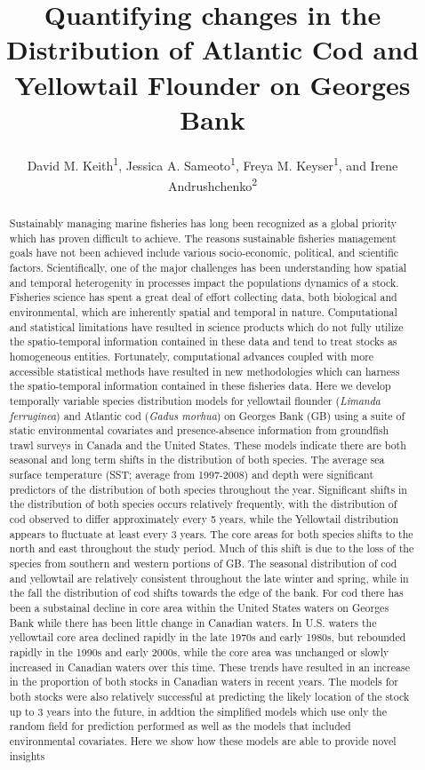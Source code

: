 \documentclass[
]{article}
\title{Quantifying changes in the Distribution of Atlantic Cod and Yellowtail Flounder on Georges Bank}
\author{David M. Keith\textsuperscript{1},
Jessica A. Sameoto\textsuperscript{1},
Freya M. Keyser\textsuperscript{1}, and
Irene Andrushchenko\textsuperscript{2}}
\date{}
\begin{document}
\maketitle
\begin{abstract}
Sustainably managing marine fisheries has long been recognized as a global priority which has proven difficult to achieve. The reasons sustainable fisheries management goals have not been achieved include various socio-economic, political, and scientific factors. Scientifically, one of the major challenges has been understanding how spatial and temporal heterogenity in processes impact the populations dynamics of a stock. Fisheries science has spent a great deal of effort collecting data, both biological and environmental, which are inherently spatial and temporal in nature. Computational and statistical limitations have resulted in science products which do not fully utilize the spatio-temporal information contained in these data and tend to treat stocks as homogeneous entities. Fortunately, computational advances coupled with more accessible statistical methods have resulted in new methodologies which can harness the spatio-temporal information contained in these fisheries data. Here we develop temporally variable species distribution models for yellowtail flounder (\emph{Limanda ferruginea}) and Atlantic cod (\emph{Gadus morhua}) on Georges Bank (GB) using a suite of static environmental covariates and presence-absence information from groundfish trawl surveys in Canada and the United States. These models indicate there are both seasonal and long term shifts in the distribution of both species. The average sea surface temperature (SST; average from 1997-2008) and depth were significant predictors of the distribution of both species throughout the year. Significant shifts in the distribution of both species occurs relatively frequently, with the distribution of cod observed to differ approximately every 5 years, while the Yellowtail distribution appears to fluctuate at least every 3 years. The core areas for both species shifts to the north and east throughout the study period. Much of this shift is due to the loss of the species from southern and western portions of GB. The seasonal distribution of cod and yellowtail are relatively consistent throughout the late winter and spring, while in the fall the distribution of cod shifts towards the edge of the bank. For cod there has been a substainal decline in core area within the United States waters on Georges Bank while there has been little change in Canadian waters. In U.S. waters the yellowtail core area declined rapidly in the late 1970s and early 1980s, but rebounded rapidly in the 1990s and early 2000s, while the core area was unchanged or slowly increased in Canadian waters over this time. These trends have resulted in an increase in the proportion of both stocks in Canadian waters in recent years. The models for both stocks were also relatively successful at predicting the likely location of the stock up to 3 years into the future, in addtion the simplified models which use only the random field for prediction performed as well as the models that included environmental covariates. Here we show how these models are able to provide novel insights 
\end{abstract}
\end{document}
